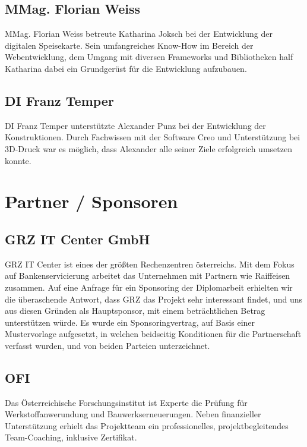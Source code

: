   \subsection*{MMag. Florian Weiss}
  MMag. Florian Weiss betreute Katharina Joksch bei der Entwicklung der digitalen Speisekarte. Sein umfangreiches
  Know-How im Bereich der Webentwicklung, dem Umgang mit diversen Frameworks und Bibliotheken half Katharina
  dabei ein Grundgerüst für die Entwicklung aufzubauen.

  \subsection*{DI Franz Temper}
  DI Franz Temper unterstützte Alexander Punz bei der Entwicklung der Konstruktionen. Durch Fachwissen mit
  der Software Creo und Unterstützung bei 3D-Druck war es möglich, dass Alexander alle seiner Ziele erfolgreich
  umsetzen konnte.

\section{Partner / Sponsoren}

\subsection*{GRZ IT Center GmbH}
{GRZ IT Center\cite{grz}} ist eines der größten Rechenzentren österreichs. Mit dem Fokus auf Bankenservicierung arbeitet das Unternehmen
mit Partnern wie Raiffeisen zusammen. Auf eine Anfrage für ein Sponsoring der Diplomarbeit erhielten wir die überaschende
Antwort, dass GRZ das Projekt sehr interessant findet, und uns aus diesen Gründen als Hauptsponsor, mit einem beträchtlichen Betrag
unterstützen würde.
Es wurde ein Sponsoringvertrag, auf Basis einer Mustervorlage aufgesetzt, in welchen beidseitig Konditionen für die Partnerschaft
verfasst wurden, und von beiden Parteien unterzeichnet.

\subsection*{OFI}
{Das Österreichische Forschungsinstitut\cite{ofi}} ist Experte die Prüfung für Werkstoffanwerundung
und Bauwerkserneuerungen. Neben finanzieller Unterstützung erhielt das Projektteam
ein professionelles, projektbegleitendes Team-Coaching, inklusive Zertifikat.

